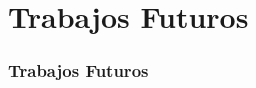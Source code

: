 \documentclass{beamer}
\begin{document}
\section{Trabajos Futuros}
\begin{frame}
\frametitle{Trabajos Futuros}
\end{frame}




\end{document}
